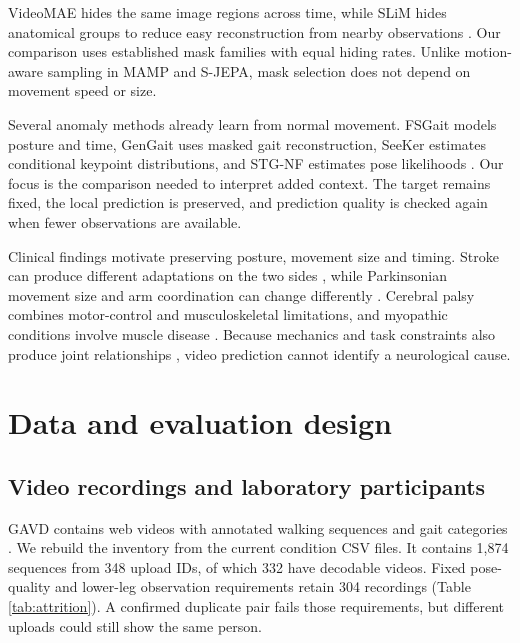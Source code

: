 \documentclass[letterpaper]{article}
\begin{document}
VideoMAE hides the same image regions across time, while SLiM hides anatomical groups to reduce easy reconstruction from nearby observations \citep{tong2022videomae, do2026slim}. Our comparison uses established mask families with equal hiding rates. Unlike motion-aware sampling in MAMP and S-JEPA, mask selection does not depend on movement speed or size.

Several anomaly methods already learn from normal movement. FSGait models posture and time, GenGait uses masked gait reconstruction, SeeKer estimates conditional keypoint distributions, and STG-NF estimates pose likelihoods \citep{duan2024fsgait, motta2026gengait, delic2025seeker, hirschorn2023stgnf}. Our focus is the comparison needed to interpret added context. The target remains fixed, the local prediction is preserved, and prediction quality is checked again when fewer observations are available.

Clinical findings motivate preserving posture, movement size and timing. Stroke can produce different adaptations on the two sides \citep{clark2010modules, awad2020drive}, while Parkinsonian movement size and arm coordination can change differently \citep{morris1994hypokinesia, sterling2015armswing}. Cerebral palsy combines motor-control and musculoskeletal limitations, and myopathic conditions involve muscle disease \citep{steele2015synergies, steele2012crouch, vandekerckhove2025dmd}. Because mechanics and task constraints also produce joint relationships \citep{kutch2012synergies}, video prediction cannot identify a neurological cause.

\section{Data and evaluation design}

\subsection{Video recordings and laboratory participants}

GAVD contains web videos with annotated walking sequences and gait categories \citep{ranjan2025gavd, gavd2026catalog}. We rebuild the inventory from the current condition CSV files. It contains 1,874 sequences from 348 upload IDs, of which 332 have decodable videos. Fixed pose-quality and lower-leg observation requirements retain 304 recordings (Table \ref{tab:attrition}). A confirmed duplicate pair fails those requirements, but different uploads could still show the same person.
\end{document}
